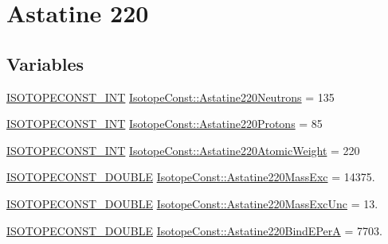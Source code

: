 \hypertarget{group___isotope_const-_astatine-_at220}{}\section{Astatine 220}
\label{group___isotope_const-_astatine-_at220}
\subsection*{Variables}
\begin{DoxyCompactItemize}
\item 
\mbox{\hyperlink{group___isotope_const-_macros_ga5f18360b3e99483a35c32d789e62621c}{I\+S\+O\+T\+O\+P\+E\+C\+O\+N\+S\+T\+\_\+\+I\+NT}} \mbox{\hyperlink{group___isotope_const-_astatine-_at220_ga40089a61c471ef3fd25dcedf24fb00c0}{Isotope\+Const\+::\+Astatine220\+Neutrons}} = 135
\item 
\mbox{\hyperlink{group___isotope_const-_macros_ga5f18360b3e99483a35c32d789e62621c}{I\+S\+O\+T\+O\+P\+E\+C\+O\+N\+S\+T\+\_\+\+I\+NT}} \mbox{\hyperlink{group___isotope_const-_astatine-_at220_gaec1e8ab21c4bf2a6cb58ed55bd0a7ad8}{Isotope\+Const\+::\+Astatine220\+Protons}} = 85
\item 
\mbox{\hyperlink{group___isotope_const-_macros_ga5f18360b3e99483a35c32d789e62621c}{I\+S\+O\+T\+O\+P\+E\+C\+O\+N\+S\+T\+\_\+\+I\+NT}} \mbox{\hyperlink{group___isotope_const-_astatine-_at220_gaaa06d6f89af9a49fbd9d06322f18176a}{Isotope\+Const\+::\+Astatine220\+Atomic\+Weight}} = 220
\item 
\mbox{\hyperlink{group___isotope_const-_macros_ga8f45a7272ce02c0b4c65c44636ed719a}{I\+S\+O\+T\+O\+P\+E\+C\+O\+N\+S\+T\+\_\+\+D\+O\+U\+B\+LE}} \mbox{\hyperlink{group___isotope_const-_astatine-_at220_ga50a11f8b11dc49405b12f6e83de1f476}{Isotope\+Const\+::\+Astatine220\+Mass\+Exc}} = 14375.
\item 
\mbox{\hyperlink{group___isotope_const-_macros_ga8f45a7272ce02c0b4c65c44636ed719a}{I\+S\+O\+T\+O\+P\+E\+C\+O\+N\+S\+T\+\_\+\+D\+O\+U\+B\+LE}} \mbox{\hyperlink{group___isotope_const-_astatine-_at220_ga812c8a89ecfa3e31238132dcbfd5802d}{Isotope\+Const\+::\+Astatine220\+Mass\+Exc\+Unc}} = 13.
\item 
\mbox{\hyperlink{group___isotope_const-_macros_ga8f45a7272ce02c0b4c65c44636ed719a}{I\+S\+O\+T\+O\+P\+E\+C\+O\+N\+S\+T\+\_\+\+D\+O\+U\+B\+LE}} \mbox{\hyperlink{group___isotope_const-_astatine-_at220_ga6f7fffe92a9e36b3680c6cb1f8520521}{Isotope\+Const\+::\+Astatine220\+Bind\+E\+PerA}} = 7703.
\item 

\end{DoxyCompactItemize}
